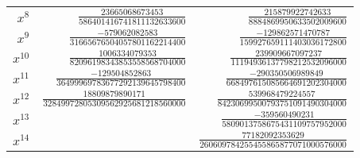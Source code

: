 \begin{longtable}{r r r}
	$x^{8}$ & $\frac{23665068673453}{586401416741811132633600}$ & $\frac{215879922742633}{8884869950633502009600}$\\
	$x^{9}$ & $\frac{-579062082583}{31665676504057801162214400}$ & $\frac{-129862571470787}{159927659111403036172800}$\\
	$x^{10}$ & $\frac{1006334079353}{82096198343853558568704000}$ & $\frac{239909667097237}{11194936137798212532096000}$\\
	$x^{11}$ & $\frac{-129504852863}{36499969783677292139645798400}$ & $\frac{-290350506989849}{668497615085664691202304000}$\\
	$x^{12}$ & $\frac{18809879890171}{32849972805309562925681218560000}$ & $\frac{539968479224557}{84230699500793751091490304000}$\\
	$x^{13}$ & & $\frac{-359560490231}{5809013758675431109757952000}$\\
	$x^{14}$ & & $\frac{77182092353629}{260609784255455865877071000576000}$
\end{longtable}
